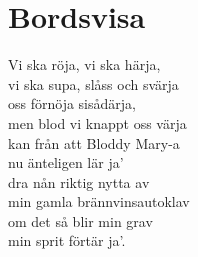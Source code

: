 \section{Bordsvisa}
Vi ska röja, vi ska härja,\\
vi ska supa, slåss och svärja\\
oss förnöja sisådärja,\\
men blod vi knappt oss värja\\
kan från att Bloddy Mary-a\\
nu änteligen lär ja'\\
dra nån riktig nytta av\\
min gamla brännvinsautoklav\\
om det så blir min grav\\
min sprit förtär ja'.\\